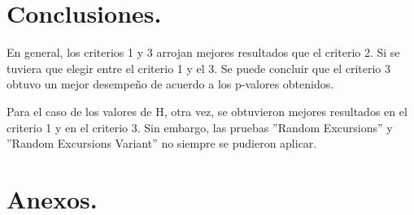 \documentclass[12pt,3p]{elsarticle}
\begin{document}
\section{Conclusiones.}
En general, los criterios 1 y 3 arrojan mejores resultados que el criterio 2. Si se tuviera que elegir entre el criterio 1 y el 3. Se puede concluir que el criterio 3 obtuvo un mejor desempeño de acuerdo a los p-valores obtenidos.

Para el caso de los valores de H, otra vez, se obtuvieron mejores resultados en el criterio 1 y en el criterio 3.
Sin embargo, las pruebas ''Random Excursions'' y ''Random Excursions Variant'' no siempre se pudieron aplicar.
\section{Anexos.}
\end{document}
